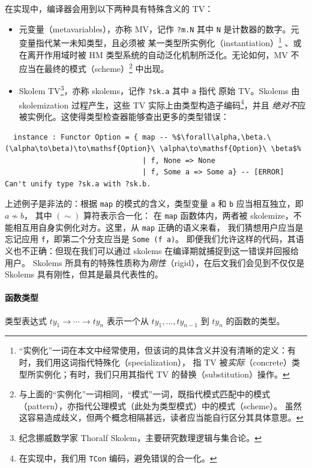 \documentclass[a4paper, 11pt]{article}
\theoremstyle{remark}\newtheorem*{remark}{Remark}
\theoremstyle{definition}\newtheorem*{definition}{Definition}
\begin{document}
在实现中，编译器会用到以下两种具有特殊含义的 TV：
\begin{itemize}
  \item 元变量（metavariables），亦称 MV，记作 \texttt{?m.N} 其中 \texttt{N} 是计数器的数字。元变量指代某一未知类型，且必须被
    某一类型所实例化（instantiation）\footnote{
      “实例化”一词在本文中经常使用，但该词的具体含义并没有清晰的定义：有时，我们用这词指代特殊化（specialization），
      指 TV 被\emph{实际}（concrete）类型所实例化；有时，我们只用其指代 TV 的替换（substitution）操作。
    }
    、或在离开作用域时被 HM 类型系统的自动泛化机制所泛化。无论如何，MV 不应当在最终的模式（scheme）\footnote{
      与上面的“实例化”一词相同，“模式”一词，既指代模式匹配中的模式（pattern），亦指代公理模式（此处为类型模式）中的模式（scheme）。
      虽然这容易造成歧义，但两个概念相隔甚远，读者应当能自行区分其具体意思。
    }
    中出现。
  \item Skolem TV\footnote{纪念挪威数学家 Thoralf Skolem，主要研究数理逻辑与集合论。}，亦称 skolems，记作 \texttt{?sk.a} 其中 \texttt{a} 指代
    原始 TV。Skolems 由 skolemization 过程产生，这些 TV 实际上由类型构造子编码\footnote{在实现中，我们用 \texttt{TCon} 编码，避免错误的合一化。}，并且
    \emph{绝对不}应被实例化。这使得类型检查器能够查出更多的类型错误：
\end{itemize}
\begin{verbatim}
  instance : Functor Option = { map -- %$\forall\alpha,\beta.\ (\alpha\to\beta)\to\mathsf{Option}\ \alpha\to\mathsf{Option}\ \beta$%
                                | f, None => None
                                | f, Some a => Some a} -- [ERROR] Can't unify type ?sk.a with ?sk.b.
\end{verbatim}

上述例子是非法的：根据 \texttt{map} 的模式的含义，类型变量 \texttt{a} 和 \texttt{b} 应当相互独立，即 $a \not\sim b$，
其中 $(\sim)$ 算符表示合一化：
在 \texttt{map} 函数体内，两者被 skolemize，不能相互用自身实例化对方。这里，从 \texttt{map} 正确的语义来看，
我们猜想用户应当是忘记应用 \texttt{f}，即第二个分支应当是 \texttt{Some (f a)}。
即便我们允许这样的代码，其语义也不正确：但现在我们可以通过 skolems 在编译期就捕捉到这一错误并回报给用户。
Skolems 所具有的特殊性质称为\emph{刚性}（rigid），在后文我们会见到不仅仅是 Skolems 具有刚性，但其是最具代表性的。

\paragraph*{函数类型}
类型表达式 \(ty_1\to\cdots\to ty_n\) 表示一个从 \(ty_1,\dots,ty_{n-1}\) 到 \(ty_n\) 的函数的类型。
\end{document}
